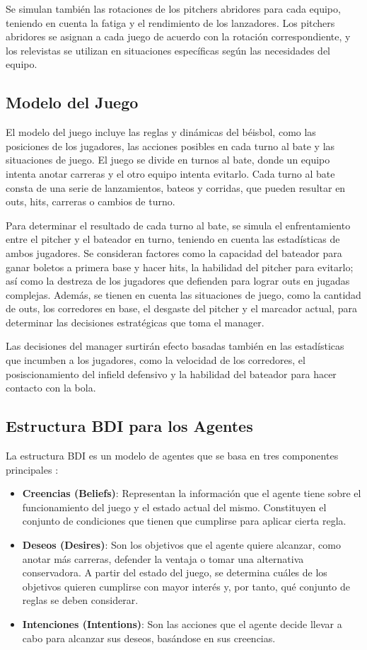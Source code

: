 \documentclass[runningheads]{llncs}
\begin{document}
        Se simulan también las rotaciones de los pitchers abridores para cada equipo, teniendo en cuenta la fatiga y el rendimiento de los lanzadores. Los pitchers abridores se asignan a cada juego de acuerdo con la rotación correspondiente, y los relevistas se utilizan en situaciones específicas según las necesidades del equipo.


    \subsection{Modelo del Juego}
        El modelo del juego incluye las reglas y dinámicas del béisbol, como las posiciones de los jugadores, las acciones posibles en cada turno al bate y las situaciones de juego. El juego se divide en turnos al bate, donde un equipo intenta anotar carreras y el otro equipo intenta evitarlo. Cada turno al bate consta de una serie de lanzamientos, bateos y corridas, que pueden resultar en outs, hits, carreras o cambios de turno. 

        Para determinar el resultado de cada turno al bate, se simula el enfrentamiento entre el pitcher y el bateador en turno, teniendo en cuenta las estadísticas de ambos jugadores. Se consideran factores como la capacidad del bateador para ganar boletos a primera base y hacer hits, la habilidad del pitcher para evitarlo; así como la destreza de los jugadores que defienden para lograr outs en jugadas complejas. Además, se tienen en cuenta las situaciones de juego, como la cantidad de outs, los corredores en base, el desgaste del pitcher y el marcador actual, para determinar las decisiones estratégicas que toma el manager. 

        Las decisiones del manager surtirán efecto basadas también en las estadísticas que incumben a los jugadores, como la velocidad de los corredores, el posiscionamiento del infield defensivo y la habilidad del bateador para hacer contacto con la bola.

    \subsection{Estructura BDI para los Agentes}
        La estructura BDI es un modelo de agentes que se basa en tres componentes principales \cite{rao1995bdi}:
        \begin{itemize}
            \item \textbf{Creencias (Beliefs)}: Representan la información que el agente tiene sobre el funcionamiento del juego y el estado actual del mismo. Constituyen el conjunto de condiciones que tienen que cumplirse para aplicar cierta regla.
            \item \textbf{Deseos (Desires)}: Son los objetivos que el agente quiere alcanzar, como anotar más carreras, defender la ventaja o tomar una alternativa conservadora. A partir del estado del juego, se determina cuáles de los objetivos quieren cumplirse con mayor interés y, por tanto, qué conjunto de reglas se deben considerar.
            \item \textbf{Intenciones (Intentions)}: Son las acciones que el agente decide llevar a cabo para alcanzar sus deseos, basándose en sus creencias.
        \end{itemize}
\end{document}
